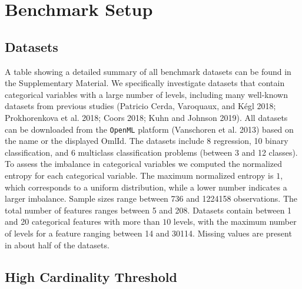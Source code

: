 \documentclass[smallextended]{svjour3}       %
\begin{document}
\hypertarget{benchmark-setup}{%
\section{Benchmark Setup}\label{benchmark-setup}}

\hypertarget{datasets}{%
\subsection{Datasets}\label{datasets}}

A table showing a detailed summary of all benchmark datasets can be found in the Supplementary Material.
We specifically investigate datasets that contain categorical variables with a large number of levels, including many well-known datasets
from previous studies (Patricio Cerda, Varoquaux, and Kégl 2018; Prokhorenkova et al. 2018; Coors 2018; Kuhn and Johnson 2019).
All datasets can be downloaded from the \texttt{OpenML} platform (Vanschoren et al. 2013) based on the name or the displayed OmlId.
The datasets include 8 regression, 10 binary classification, and 6 multiclass classification problems (between 3 and 12 classes).
To assess the imbalance in categorical variables we computed the normalized entropy for each categorical variable.
The maximum normalized entropy is \(1\), which corresponds to a uniform distribution, while a lower number indicates a larger imbalance.
Sample sizes range between 736 and 1224158 observations.
The total number of features ranges between 5 and 208.
Datasets contain between 1 and 20 categorical features with more than \(10\) levels, with the maximum number of levels for a feature ranging between 14 and 30114. Missing values are present in about half of the datasets.

\hypertarget{high-cardinality-threshold}{%
\subsection{High Cardinality Threshold}\label{high-cardinality-threshold}}

\label{sec:HCT}
\end{document}
